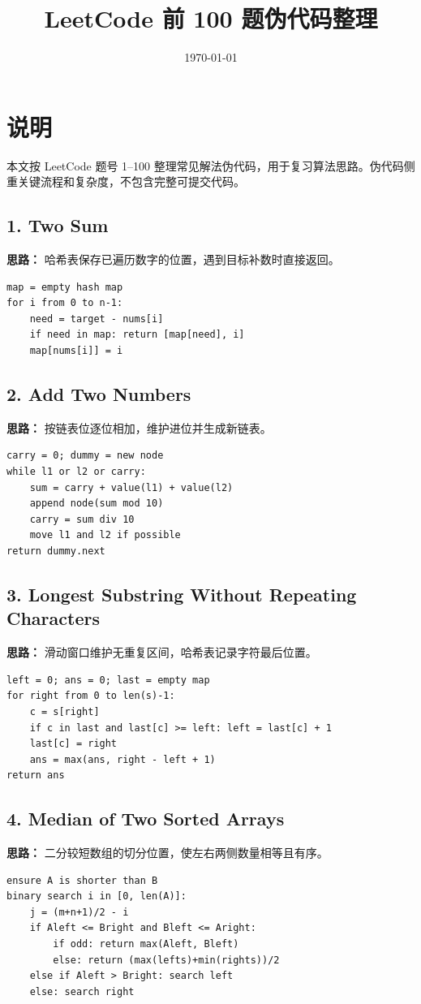 \documentclass[11pt,a4paper]{ctexart}
\title{LeetCode 前 100 题伪代码整理}
\author{}
\date{\today}
\begin{document}
\maketitle
\tableofcontents
\newpage

\section*{说明}
本文按 LeetCode 题号 1--100 整理常见解法伪代码，用于复习算法思路。伪代码侧重关键流程和复杂度，不包含完整可提交代码。

\newcommand{\problem}[3]{
\subsection{#1. #2}
\textbf{思路：} #3
}

\problem{1}{Two Sum}{哈希表保存已遍历数字的位置，遇到目标补数时直接返回。}
\begin{verbatim}
map = empty hash map
for i from 0 to n-1:
    need = target - nums[i]
    if need in map: return [map[need], i]
    map[nums[i]] = i
\end{verbatim}

\problem{2}{Add Two Numbers}{按链表位逐位相加，维护进位并生成新链表。}
\begin{verbatim}
carry = 0; dummy = new node
while l1 or l2 or carry:
    sum = carry + value(l1) + value(l2)
    append node(sum mod 10)
    carry = sum div 10
    move l1 and l2 if possible
return dummy.next
\end{verbatim}

\problem{3}{Longest Substring Without Repeating Characters}{滑动窗口维护无重复区间，哈希表记录字符最后位置。}
\begin{verbatim}
left = 0; ans = 0; last = empty map
for right from 0 to len(s)-1:
    c = s[right]
    if c in last and last[c] >= left: left = last[c] + 1
    last[c] = right
    ans = max(ans, right - left + 1)
return ans
\end{verbatim}

\problem{4}{Median of Two Sorted Arrays}{二分较短数组的切分位置，使左右两侧数量相等且有序。}
\begin{verbatim}
ensure A is shorter than B
binary search i in [0, len(A)]:
    j = (m+n+1)/2 - i
    if Aleft <= Bright and Bleft <= Aright:
        if odd: return max(Aleft, Bleft)
        else: return (max(lefts)+min(rights))/2
    else if Aleft > Bright: search left
    else: search right
\end{verbatim}
\end{document}
